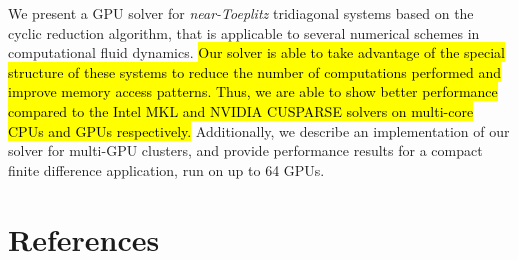\documentclass{elsarticle}
\begin{document}
We present a GPU solver for \emph{near-Toeplitz} tridiagonal systems
based on the cyclic reduction algorithm,
that is applicable to several numerical schemes
in computational fluid dynamics.
\hl{Our solver is able to take advantage of the
special structure of these systems
to reduce the number of computations performed and
improve memory access patterns.
Thus, we are able to show better performance
compared to the Intel MKL and NVIDIA CUSPARSE solvers
on multi-core CPUs and GPUs respectively.}
Additionally, we describe an implementation of our solver
for multi-GPU clusters,
and provide performance results for a
compact finite difference application,
run on up to 64 GPUs.

\pagebreak
\section*{References}


\end{document}
